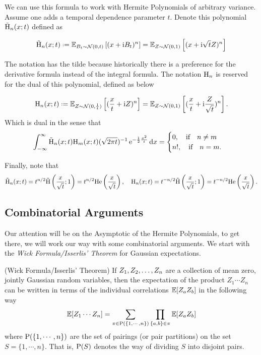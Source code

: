 We can use this formula to work with Hermite Polynomials of arbitrary variance. Assume one adds a temporal dependence parameter $t$. Denote this polynomial $\tilde{\mathrm{H}}_n(x;t)$ defined as
\begin{definition}
	\begin{equation}
		\Het_n(x;t) \deff \E_{B_t \sim \mathcal{N}(0,t)}\left[(x+\ii B_t)^n\right] = \E_{Z \sim \mathcal{N}(0,1)}\left[(x+\ii \sqrt{t} Z)^n\right]
	\end{equation}
\end{definition}
The notation has the tilde because historically there is a preference for the derivative formula instead of the integral formula. The notation $\mathrm{H}_n$ is reserved for the dual of this polynomial, defined as below
\begin{definition}
	\begin{equation}
		\Her_n(x;t) \deff \E_{Z \sim \mathcal{N}(0,\frac{1}{t})}\left[(\frac{x}{t}+\ii Z)^n\right] = \E_{Z \sim \mathcal{N}(0,1)}\left[(\frac{x}{t}+\ii \frac{Z}{\sqrt{t}})^n\right].
	\end{equation}
	Which is dual in the sense that
	\begin{equation}
		\int_{-\infty}^{\infty} \tilde{\mathrm{H}}_n(x;t) \mathrm{H}_m(x;t) (\sqrt{2\pi t})^{-1} \operatorname{e}^{-\frac{1}{2} \frac{x^2}{t}} \mathrm{d} x = 
		\begin{cases}
			0, \quad \text{if} \quad n \neq m \\
			n!, \quad \text{if} \quad n = m.
		\end{cases}
	\end{equation}
\end{definition}
Finally, note that
\begin{equation}
	\tilde{\mathrm{H}}_n(x;t) = t^{n/2} \tilde{\mathrm{H}}\left(\frac{x}{\sqrt{t}};1\right) = t^{n/2} \mathrm{He}\left(\frac{x}{\sqrt{t}}\right), \quad \mathrm{H}_n(x;t) = t^{-n/2} \tilde{\mathrm{H}}\left(\frac{x}{\sqrt{t}};1\right) = t^{-n/2} \mathrm{He}\left(\frac{x}{\sqrt{t}}\right).
\end{equation}

\subsection{Combinatorial Arguments} 

Our attention will be on the Asymptotic of the Hermite Polynomials, to get there, we will work our way with some combinatorial arguments. We start with the \textit{Wick Formula/Isserlis' Theorem} for Gaussian expectations.
\begin{thm}
	(Wick Formula/Isserlis' Theorem) If $Z_1, Z_2, \dots, Z_n$ are a collection of mean zero, jointly Gaussian random variables, then the expectation of the product $Z_1 \cdots Z_n$ can be written in terms of the individual correlations $\mathbb{E}[Z_a Z_b]$ in the following way
	\begin{equation}
		\mathbb{E}[Z_1 \cdots Z_n] = \sum_{\pi \in \mathrm{P}(\{1,\cdots,n\})} \prod_{\{a,b\} \in \pi} \mathbb{E}[Z_a Z_b]
	\end{equation}
	where $\mathrm{P}(\{1,\cdots,n\})$ are the set of pairings (or pair partitions) on the set $S = \{1, \cdots, n\}$. That is, $\mathrm{P}(S)$ denotes the way of dividing $S$ into disjoint pairs.
	\label{Theorem: Wick-Isserlis}
\end{thm}

